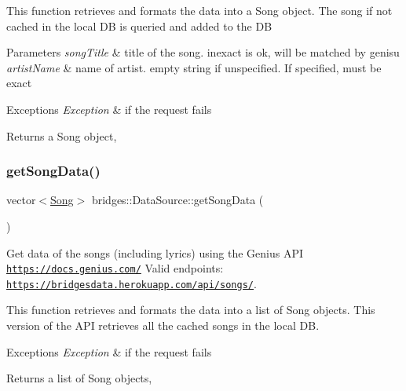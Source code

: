 This function retrieves and formats the data into a Song object. The song if not cached in the local DB is queried and added to the DB


\begin{DoxyParams}{Parameters}
{\em song\+Title} & title of the song. inexact is ok, will be matched by genisu \\
\hline
{\em artist\+Name} & name of artist. empty string if unspecified. If specified, must be exact \\
\hline
\end{DoxyParams}

\begin{DoxyExceptions}{Exceptions}
{\em Exception} & if the request fails\\
\hline
\end{DoxyExceptions}
\begin{DoxyReturn}{Returns}
a Song object, 
\end{DoxyReturn}
\mbox{\label{classbridges_1_1_data_source_a5e8d035a1becf96c71569e0966e93849}} 
\subsubsection{\texorpdfstring{get\+Song\+Data()}{getSongData()}}
{\footnotesize\ttfamily vector$<$\hyperlink{classbridges_1_1dataset_1_1_song}{Song}$>$ bridges\+::\+Data\+Source\+::get\+Song\+Data (\begin{DoxyParamCaption}{ }\end{DoxyParamCaption})\hspace{0.3cm}{\ttfamily [inline]}}



Get data of the songs (including lyrics) using the Genius A\+PI \href{https://docs.genius.com/}{\tt https\+://docs.\+genius.\+com/} Valid endpoints\+: \href{https://bridgesdata.herokuapp.com/api/songs/}{\tt https\+://bridgesdata.\+herokuapp.\+com/api/songs/}. 

This function retrieves and formats the data into a list of Song objects. This version of the A\+PI retrieves all the cached songs in the local DB.


\begin{DoxyExceptions}{Exceptions}
{\em Exception} & if the request fails\\
\hline
\end{DoxyExceptions}
\begin{DoxyReturn}{Returns}
a list of Song objects, 
\end{DoxyReturn}
\mbox{\label{classbridges_1_1_data_source_a25b33736b4ae9ffea5fe4ebf5dbb3a63}} 
